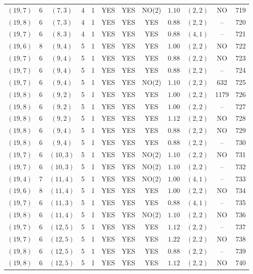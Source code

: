 \begin{longtable}{|c|c|c|c|c|c|c|c|c|c|c|c|}
$(19,7)$ & 6 & $(7,3)$ & 4 & 1 & YES & YES & NO(2) & $1.10$ & $(2,2)$ & NO & 719\\
$(19,8)$ & 6 & $(7,3)$ & 4 & 1 & YES & YES & YES & $0.88$ & $(2,2)$ & -- & 720\\
$(19,7)$ & 6 & $(8,3)$ & 4 & 1 & YES & YES & YES & $0.88$ & $(4,1)$ & -- & 721\\
$(19,6)$ & 8 & $(9,4)$ & 5 & 1 & YES & YES & YES & $1.00$ & $(2,2)$ & NO & 722\\
$(19,7)$ & 6 & $(9,4)$ & 5 & 1 & YES & YES & YES & $0.88$ & $(2,2)$ & NO & 723\\
$(19,7)$ & 6 & $(9,4)$ & 5 & 1 & YES & YES & YES & $0.88$ & $(2,2)$ & -- & 724\\
$(19,7)$ & 6 & $(9,4)$ & 5 & 1 & YES & YES & NO(2) & $1.10$ & $(2,2)$ & 632 & 725\\
$(19,8)$ & 6 & $(9,2)$ & 5 & 1 & YES & YES & YES & $1.00$ & $(2,2)$ & 1179 & 726\\
$(19,8)$ & 6 & $(9,2)$ & 5 & 1 & YES & YES & YES & $1.00$ & $(2,2)$ & -- & 727\\
$(19,8)$ & 6 & $(9,2)$ & 5 & 1 & YES & YES & YES & $1.12$ & $(2,2)$ & NO & 728\\
$(19,8)$ & 6 & $(9,4)$ & 5 & 1 & YES & YES & YES & $0.88$ & $(2,2)$ & NO & 729\\
$(19,8)$ & 6 & $(9,4)$ & 5 & 1 & YES & YES & YES & $0.88$ & $(2,2)$ & -- & 730\\
$(19,7)$ & 6 & $(10,3)$ & 5 & 1 & YES & YES & NO(2) & $1.10$ & $(2,2)$ & NO & 731\\
$(19,7)$ & 6 & $(10,3)$ & 5 & 1 & YES & YES & NO(2) & $1.10$ & $(2,2)$ & -- & 732\\
$(19,4)$ & 7 & $(11,4)$ & 5 & 1 & YES & YES & NO(2) & $1.00$ & $(4,1)$ & -- & 733\\
$(19,6)$ & 8 & $(11,4)$ & 5 & 1 & YES & YES & YES & $1.00$ & $(2,2)$ & NO & 734\\
$(19,7)$ & 6 & $(11,3)$ & 5 & 1 & YES & YES & YES & $0.88$ & $(4,1)$ & -- & 735\\
$(19,8)$ & 6 & $(11,4)$ & 5 & 1 & YES & YES & NO(2) & $1.10$ & $(2,2)$ & NO & 736\\
$(19,7)$ & 6 & $(12,5)$ & 5 & 1 & YES & YES & YES & $1.12$ & $(2,2)$ & -- & 737\\
$(19,7)$ & 6 & $(12,5)$ & 5 & 1 & YES & YES & YES & $1.22$ & $(2,2)$ & NO & 738\\
$(19,8)$ & 6 & $(12,5)$ & 5 & 1 & YES & YES & YES & $0.88$ & $(2,2)$ & -- & 739\\
$(19,8)$ & 6 & $(12,5)$ & 5 & 1 & YES & YES & YES & $1.12$ & $(2,2)$ & NO & 740\\

\end{longtable}
